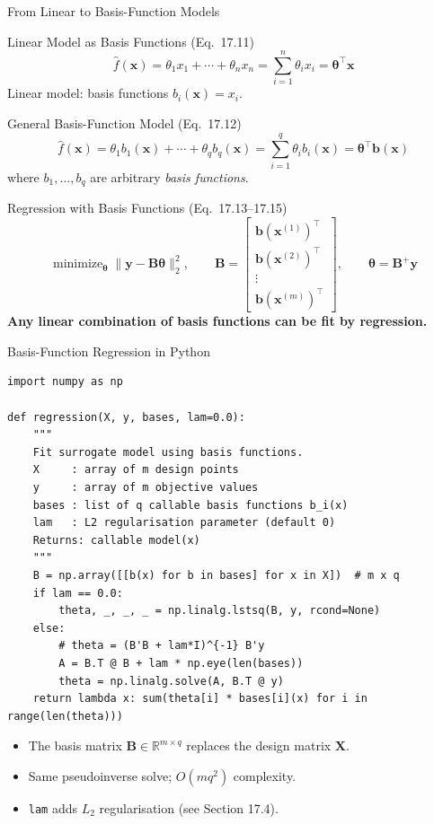 \documentclass[aspectratio=169,10pt]{beamer}
\newcommand{\vx}{\mathbf{x}}
\newcommand{\vy}{\mathbf{y}}
\newcommand{\vb}{\mathbf{b}}
\newcommand{\btheta}{\boldsymbol{\theta}}
\newcommand{\bX}{\mathbf{X}}
\newcommand{\bB}{\mathbf{B}}
\newcommand{\R}{\mathbb{R}}
\newcommand{\hatf}{\hat{f}}
\DeclareMathOperator*{\minimize}{minimize}
\begin{document}
\begin{frame}{From Linear to Basis-Function Models}
  \begin{block}{Linear Model as Basis Functions (Eq.\ 17.11)}
    \[
      \hatf(\vx) = \theta_1 x_1 + \cdots + \theta_n x_n
                 = \sum_{i=1}^{n} \theta_i x_i
                 = \btheta^{\top}\vx
    \]
    Linear model: basis functions $b_i(\vx) = x_i$.
  \end{block}

  \begin{block}{General Basis-Function Model (Eq.\ 17.12)}
    \[
      \hatf(\vx) = \theta_1 b_1(\vx) + \cdots + \theta_q b_q(\vx)
                 = \sum_{i=1}^{q}\theta_i b_i(\vx)
                 = \btheta^{\top}\vb(\vx)
    \]
    where $b_1, \ldots, b_q$ are arbitrary \emph{basis functions}.
  \end{block}

  \begin{block}{Regression with Basis Functions (Eq.\ 17.13--17.15)}
    \[
      \minimize_{\btheta} \|\vy - \bB\btheta\|_2^2,
      \qquad
      \bB =
      \begin{bmatrix}
        \vb(\vx^{(1)})^{\top} \\
        \vb(\vx^{(2)})^{\top} \\
        \vdots \\
        \vb(\vx^{(m)})^{\top}
      \end{bmatrix},
      \qquad
      \btheta = \bB^{+}\vy
    \]
    \textbf{Any linear combination of basis functions can be fit by regression.}
  \end{block}
\end{frame}

\begin{frame}[fragile]{Basis-Function Regression in Python}
\begin{lstlisting}[style=python, caption={General basis-function regression (Algorithm 17.2 equivalent)}]
import numpy as np

def regression(X, y, bases, lam=0.0):
    """
    Fit surrogate model using basis functions.
    X     : array of m design points
    y     : array of m objective values
    bases : list of q callable basis functions b_i(x)
    lam   : L2 regularisation parameter (default 0)
    Returns: callable model(x)
    """
    B = np.array([[b(x) for b in bases] for x in X])  # m x q
    if lam == 0.0:
        theta, _, _, _ = np.linalg.lstsq(B, y, rcond=None)
    else:
        # theta = (B'B + lam*I)^{-1} B'y
        A = B.T @ B + lam * np.eye(len(bases))
        theta = np.linalg.solve(A, B.T @ y)
    return lambda x: sum(theta[i] * bases[i](x) for i in range(len(theta)))
\end{lstlisting}
  \vspace{-4pt}
  \begin{itemize}
    \item The basis matrix $\bB \in \R^{m \times q}$ replaces the design matrix $\bX$.
    \item Same pseudoinverse solve; $O(mq^2)$ complexity.
    \item \texttt{lam} adds $L_2$ regularisation (see Section 17.4).
  \end{itemize}
\end{frame}
\end{document}

